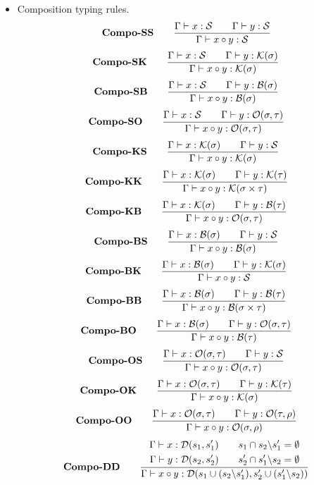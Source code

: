 \begin{itemize}
    \item Composition typing rules. 
    \[  \textbf{Compo-SS} \qquad
        \frac{\Gamma \vdash x : \mathcal{S} \qquad \Gamma \vdash y : \mathcal{S}}{\Gamma \vdash x \circ y : \mathcal{S}}
    \]
    \[  \textbf{Compo-SK} \qquad
        \frac{\Gamma \vdash x : \mathcal{S} \qquad \Gamma \vdash y : \mathcal{K}(\sigma)}{\Gamma \vdash x \circ y : \mathcal{K}(\sigma)}
    \]
    \[  \textbf{Compo-SB} \qquad
        \frac{\Gamma \vdash x : \mathcal{S} \qquad \Gamma \vdash y : \mathcal{B}(\sigma)}{\Gamma \vdash x \circ y : \mathcal{B}(\sigma)}
    \]
    \[  \textbf{Compo-SO} \qquad
        \frac{\Gamma \vdash x : \mathcal{S} \qquad \Gamma \vdash y : \mathcal{O}(\sigma, \tau)}{\Gamma \vdash x \circ y : \mathcal{O}(\sigma, \tau)}
    \]
    \[  \textbf{Compo-KS} \qquad
        \frac{\Gamma \vdash x : \mathcal{K}(\sigma) \qquad \Gamma \vdash y : \mathcal{S}}{\Gamma \vdash x \circ y : \mathcal{K}(\sigma)}
    \]
    \[  \textbf{Compo-KK} \qquad
        \frac{\Gamma \vdash x : \mathcal{K}(\sigma) \qquad \Gamma \vdash y : \mathcal{K}(\tau)}{\Gamma \vdash x \circ y : \mathcal{K}(\sigma \times \tau)}
    \]
    \[  \textbf{Compo-KB} \qquad
        \frac{\Gamma \vdash x : \mathcal{K}(\sigma) \qquad \Gamma \vdash y : \mathcal{B}(\tau)}{\Gamma \vdash x \circ y : \mathcal{O}(\sigma, \tau)}
    \]
    \[  \textbf{Compo-BS} \qquad
        \frac{\Gamma \vdash x : \mathcal{B}(\sigma) \qquad \Gamma \vdash y : \mathcal{S}}{\Gamma \vdash x \circ y : \mathcal{B}(\sigma)}
    \]
    \[  \textbf{Compo-BK} \qquad
        \frac{\Gamma \vdash x : \mathcal{B}(\sigma) \qquad \Gamma \vdash y : \mathcal{K}(\sigma)}{\Gamma \vdash x \circ y : \mathcal{S}}
    \]
    \[  \textbf{Compo-BB} \qquad
        \frac{\Gamma \vdash x : \mathcal{B}(\sigma) \qquad \Gamma \vdash y : \mathcal{B}(\tau)}{\Gamma \vdash x \circ y : \mathcal{B}(\sigma \times \tau)}
    \]
    \[  \textbf{Compo-BO} \qquad
        \frac{\Gamma \vdash x : \mathcal{B}(\sigma) \qquad \Gamma \vdash y : \mathcal{O}(\sigma, \tau)}{\Gamma \vdash x \circ y : \mathcal{B}(\tau)}
    \]
    \[  \textbf{Compo-OS} \qquad
        \frac{\Gamma \vdash x : \mathcal{O}(\sigma, \tau) \qquad \Gamma \vdash y : \mathcal{S}}{\Gamma \vdash x \circ y : \mathcal{O}(\sigma, \tau)}
    \]
    \[  \textbf{Compo-OK} \qquad
        \frac{\Gamma \vdash x : \mathcal{O}(\sigma, \tau) \qquad \Gamma \vdash y : \mathcal{K}(\tau)}{\Gamma \vdash x \circ y : \mathcal{K}(\sigma)}
    \]
    \[  \textbf{Compo-OO} \qquad
        \frac{\Gamma \vdash x : \mathcal{O}(\sigma, \tau) \qquad \Gamma \vdash y : \mathcal{O}(\tau, \rho)}{\Gamma \vdash x \circ y : \mathcal{O}(\sigma, \rho)}
    \]
    \[
        \textbf{Compo-DD} \qquad
        \frac{
            \begin{aligned}
                \Gamma \vdash x : \mathcal{D}(s_1,s_1') \\
                \Gamma \vdash y : \mathcal{D}(s_2,s_2')
            \end{aligned}
            \qquad 
            \begin{aligned}
                s_1 \cap s_2 \backslash s_1' = \emptyset \\
                s_2' \cap s_1' \backslash s_2 = \emptyset
            \end{aligned}
        }
        {\Gamma \vdash x\circ y : \mathcal{D}(s_1 \cup (s_2\backslash s_1'), s_2' \cup (s_1'\backslash s_2))}
    \]



\end{itemize}
